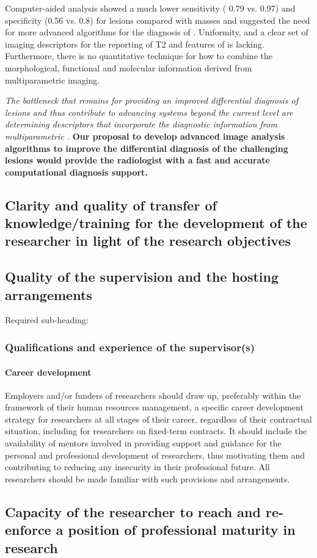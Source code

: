  Computer-aided analysis showed a much lower
sensitivity ( 0.79 vs. 0.97) and specificity (0.56 vs. 0.8) for \nmle lesions
compared with masses and suggested the need for more advanced
algorithms for the diagnosis of \nmle \cite{Newell,Vag,Jansen1,Jansen2}.
Uniformity, and a clear set of imaging descriptors for the reporting of T2 and \dwi features of \nmle is lacking.
Furthermore, there is no quantitative technique  for how to combine the morphological, functional and
molecular information derived from multiparametric imaging.

{\it The bottleneck that remains for providing an improved
differential diagnosis of \nmle lesions and thus
contribute to advancing \cad systems beyond the current  level are
determining
descriptors that incorporate  the diagnostic information from
multiparametric \mri.}
 {\bf Our proposal to develop advanced image analysis algorithms to improve the differential diagnosis
 of the challenging \nmle lesions
would provide the radiologist with a fast and accurate computational diagnosis support.}

\subsection{Clarity and quality of transfer of knowledge/training for the development of the researcher in light of the research objectives}
\label{sec:transfer}


\subsection{Quality of the supervision and the hosting arrangements}
\label{sec:supervision}

Required sub-heading:
\subsubsection*{Qualifications and experience of the supervisor(s)}


\paragraph{Career development}
Employers and/or funders of researchers should draw up, preferably within the framework of their human resources management, a specific career development strategy for researchers at all stages of their career, regardless of their contractual situation, including for researchers on fixed-term contracts. It should include the availability of mentors involved in providing support and guidance for the personal and professional development of researchers, thus motivating them and contributing to reducing any insecurity in their professional future. All researchers should be made familiar with such provisions and arrangements.

\subsection{Capacity of the researcher to reach and re-enforce a position of professional maturity in research}
\label{sec:maturity}

